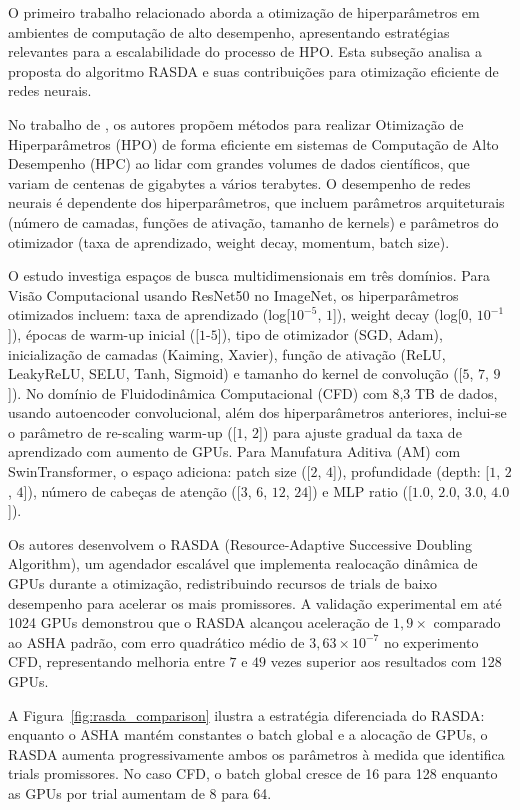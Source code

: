 O primeiro trabalho relacionado aborda a otimização de hiperparâmetros em ambientes de computação de alto desempenho, apresentando estratégias relevantes para a escalabilidade do processo de HPO. Esta subseção analisa a proposta do algoritmo RASDA e suas contribuições para otimização eficiente de redes neurais.

No trabalho de \cite{Aach2025}, os autores propõem métodos para realizar Otimização de Hiperparâmetros (HPO) de forma eficiente em sistemas de Computação de Alto Desempenho (HPC) ao lidar com grandes volumes de dados científicos, que variam de centenas de gigabytes a vários terabytes. O desempenho de redes neurais é dependente dos hiperparâmetros, que incluem parâmetros arquiteturais (número de camadas, funções de ativação, tamanho de kernels) e parâmetros do otimizador (taxa de aprendizado, weight decay, momentum, batch size).

O estudo investiga espaços de busca multidimensionais em três domínios. Para Visão Computacional usando ResNet50 no ImageNet, os hiperparâmetros otimizados incluem: taxa de aprendizado (log[$10^{-5}$, $1$]), weight decay (log[$0$, $10^{-1}$]), épocas de warm-up inicial ([$1$-$5$]), tipo de otimizador (SGD, Adam), inicialização de camadas (Kaiming, Xavier), função de ativação (ReLU, LeakyReLU, SELU, Tanh, Sigmoid) e tamanho do kernel de convolução ([$5$, $7$, $9$]). No domínio de Fluidodinâmica Computacional (CFD) com 8,3 TB de dados, usando autoencoder convolucional, além dos hiperparâmetros anteriores, inclui-se o parâmetro de re-scaling warm-up ([$1$, $2$]) para ajuste gradual da taxa de aprendizado com aumento de GPUs. Para Manufatura Aditiva (AM) com SwinTransformer, o espaço adiciona: patch size ([$2$, $4$]), profundidade (depth: [$1$, $2$, $4$]), número de cabeças de atenção ([$3$, $6$, $12$, $24$]) e MLP ratio ([$1.0$, $2.0$, $3.0$, $4.0$]).

Os autores desenvolvem o RASDA (Resource-Adaptive Successive Doubling Algorithm), um agendador escalável que implementa realocação dinâmica de GPUs durante a otimização, redistribuindo recursos de trials de baixo desempenho para acelerar os mais promissores. A validação experimental em até 1024 GPUs demonstrou que o RASDA alcançou aceleração de $1,9\times$ comparado ao ASHA padrão, com erro quadrático médio de $3,63 \times 10^{-7}$ no experimento CFD, representando melhoria entre $7$ e $49$ vezes superior aos resultados com 128 GPUs.

A Figura~\ref{fig:rasda_comparison} ilustra a estratégia diferenciada do RASDA: enquanto o ASHA mantém constantes o batch global e a alocação de GPUs, o RASDA aumenta progressivamente ambos os parâmetros à medida que identifica trials promissores. No caso CFD, o batch global cresce de 16 para 128 enquanto as GPUs por trial aumentam de 8 para 64.

